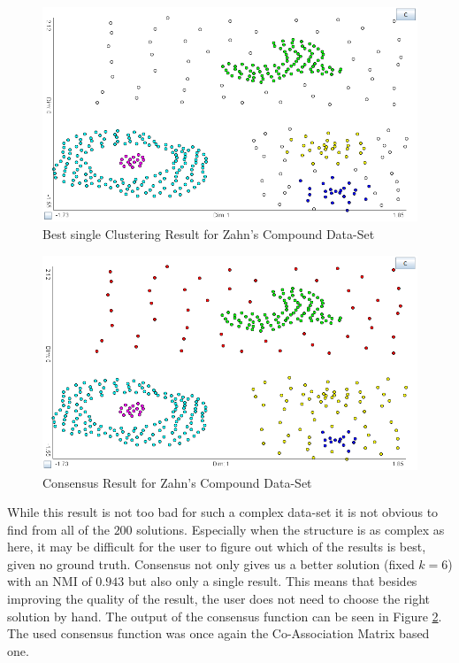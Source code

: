 \documentclass[
	a4paper,
	english,
	twoside,
	openright,               
	11pt                            
	]{report}
\begin{document}
\begin{figure}[h]
	\centering
	\includegraphics[scale=.4]{zahn_best}
	\caption{Best single Clustering Result for Zahn's Compound Data-Set}
	\label{fig:zahn_best}
\end{figure}
\begin{figure}[h]
	\centering
	\includegraphics[scale=.4]{zahn_consensus}
	\caption{Consensus Result for Zahn's Compound Data-Set}
	\label{fig:zahn_consensus}
\end{figure}

While this result is not too bad for such a complex data-set it is not obvious to find from all of the $200$ solutions. Especially when the structure is as complex as here, it may be difficult for the user to figure out which of the results is best, given no ground truth. Consensus not only gives us a better solution (fixed $k=6$) with an NMI of $0.943$ but also only a single result. This means that besides improving the quality of the result, the user does not need to choose the right solution by hand. The output of the consensus function can be seen in Figure \ref{fig:zahn_consensus}. The used consensus function was once again the Co-Association Matrix based one.
\end{document}
